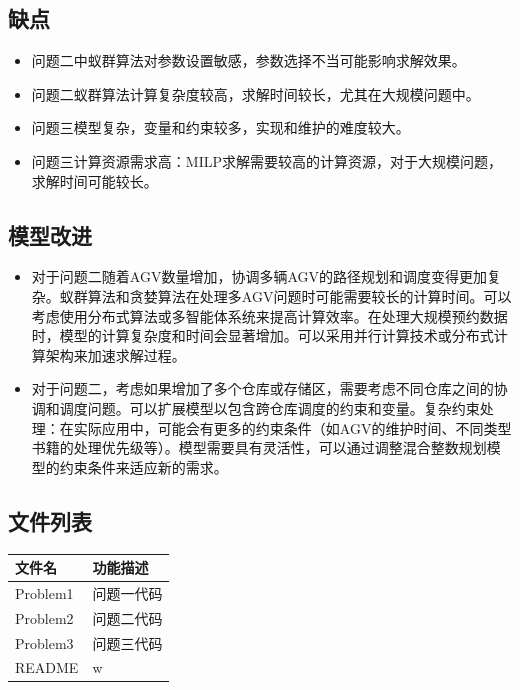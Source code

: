 \documentclass[withoutpreface,bwprint]{thesis-config}
\begin{document}
\subsection{缺点}
\begin{itemize}[itemindent=2em]
\item 问题二中蚁群算法对参数设置敏感，参数选择不当可能影响求解效果。
\item 问题二蚁群算法计算复杂度较高，求解时间较长，尤其在大规模问题中。
\item 问题三模型复杂，变量和约束较多，实现和维护的难度较大。
\item 问题三计算资源需求高：MILP求解需要较高的计算资源，对于大规模问题，求解时间可能较长。
\end{itemize}



\subsection{模型改进}
\begin{itemize}[itemindent=2em]
\item 对于问题二随着AGV数量增加，协调多辆AGV的路径规划和调度变得更加复杂。蚁群算法和贪婪算法在处理多AGV问题时可能需要较长的计算时间。可以考虑使用分布式算法或多智能体系统来提高计算效率。在处理大规模预约数据时，模型的计算复杂度和时间会显著增加。可以采用并行计算技术或分布式计算架构来加速求解过程。
\item 对于问题二，考虑如果增加了多个仓库或存储区，需要考虑不同仓库之间的协调和调度问题。可以扩展模型以包含跨仓库调度的约束和变量。复杂约束处理：在实际应用中，可能会有更多的约束条件（如AGV的维护时间、不同类型书籍的处理优先级等）。模型需要具有灵活性，可以通过调整混合整数规划模型的约束条件来适应新的需求。
\end{itemize}


\clearpage
\nocite{*}


\begin{appendices}
\section{文件列表}
\begin{table}[H]
\centering
\begin{tabularx}{\textwidth}{LL}
\toprule
文件名   & 功能描述 \\
\midrule
Problem1 & 问题一代码\\
Problem2 & 问题二代码\\
Problem3 & 问题三代码\\
README & w\\

\bottomrule
\end{tabularx}
\label{tab:文件列表}
\end{table}
\end{appendices}
\end{document}
